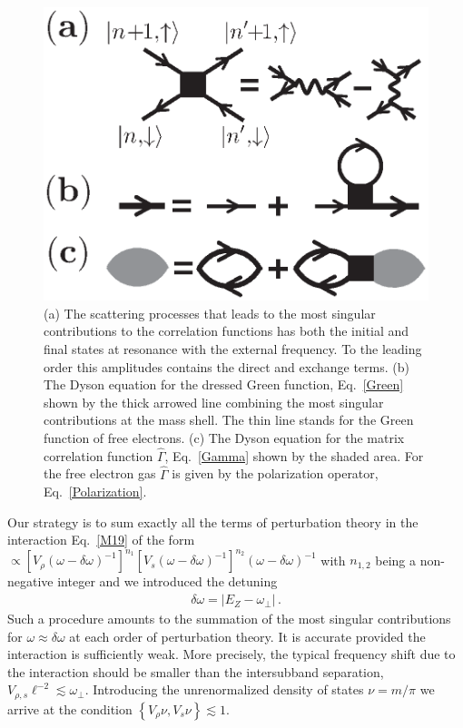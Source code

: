 \begin{figure}[h]
\begin{center}
\includegraphics[width=0.4\columnwidth]{fig5.eps}
\caption{(a) The scattering processes that leads to the most singular contributions to the correlation functions has both the initial and final states at resonance with the external frequency.
To the leading order this amplitudes contains the direct and exchange terms.
(b) The Dyson equation for the dressed Green function, Eq.~\eqref{Green} shown by the thick arrowed line combining the most singular contributions at the mass shell.
The thin line stands for the Green function of free electrons. 
(c) The Dyson equation for the matrix correlation function $\hat{\Gamma}$, Eq.~\eqref{Gamma} shown by the shaded area.
For the free electron gas $\hat{\Gamma}$ is given by the polarization operator, Eq.~\eqref{Polarization}.\cite{Iqbal}}
\label{fig:scattering}
\end{center}
\end{figure}




Our strategy is to sum exactly all the terms of perturbation theory in the interaction Eq.~\eqref{M19} of the form $\propto \left[ V_{\rho} (\omega - \delta \omega)^{-1} \right]^{n_1} \left[ V_{s} (\omega - \delta \omega)^{-1}\right]^{n_2} (\omega - \delta \omega)^{-1}$ with $n_{1,2}$ being a non-negative integer and we introduced the detuning 
\begin{align}\label{detuning}
\delta \omega = | E_Z - \omega_{\perp} |\, .
\end{align}
Such a procedure amounts to the summation of the most singular contributions for $\omega \approx \delta \omega$ at each order of perturbation theory.
It is accurate provided the interaction is sufficiently weak.
More precisely, the typical frequency shift due to the interaction should be smaller than the intersubband separation, 
$V_{\rho,s} \ell^{-2} \lesssim \omega_{\perp}$.
Introducing the unrenormalized density of states $\nu = m / \pi$ we arrive at the condition $\left\{ V_{\rho} \nu, V_s \nu \right\} \lesssim 1$.


